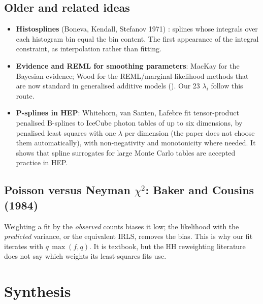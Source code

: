 \subsection{Older and related ideas}

\begin{itemize}
  \item \textbf{Histosplines} (Boneva, Kendall, Stefanov 1971) \cite{Boneva1971}: splines
    whose integrals over each histogram bin equal the bin content. The first appearance of the
    integral constraint, as interpolation rather than fitting.
  \item \textbf{Evidence and REML for smoothing parameters}: MacKay \cite{MacKay1992} for
    the Bayesian evidence; Wood \cite{Wood2011} for the REML/marginal-likelihood methods that
    are now standard in generalised additive models (). Our 23 $\lambda_i$ follow
    this route.
  \item \textbf{P-splines in HEP}: Whitehorn, van Santen, Lafebre \cite{Whitehorn2013} fit
    tensor-product penalised B-splines to IceCube photon tables of up to six dimensions, by
    penalised least squares with one $\lambda$ per dimension (the paper does not choose them
    automatically), with non-negativity and monotonicity where needed. It shows that spline
    surrogates for large Monte Carlo tables are accepted practice in HEP.
\end{itemize}

\subsection{Poisson versus Neyman $\chi^2$: Baker and Cousins (1984) \cite{BakerCousins1984}}
\label{sec:baker}

Weighting a fit by the \emph{observed} counts biases it low; the likelihood with the
\emph{predicted} variance, or the equivalent IRLS, removes the bias. This is why our fit
iterates with $q\,\max(f,q)$. It is textbook, but the HH reweighting literature does not say
which weights its least-squares fits use.

\section{Synthesis}
\label{sec:synth}

